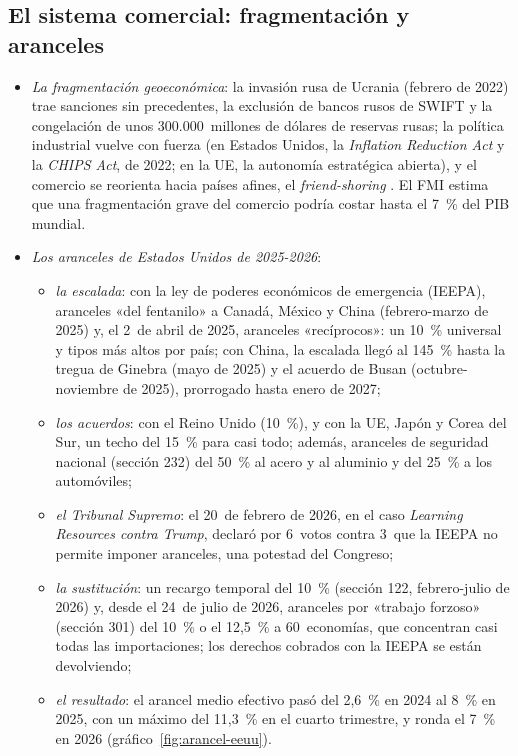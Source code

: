 \documentclass[11pt]{article}
\begin{document}
\subsection{El sistema comercial: fragmentación y aranceles}\label{sec:comercial-actual}

\begin{itemize}
\item \emph{La fragmentación geoeconómica}: la invasión rusa de Ucrania (febrero de 2022) trae sanciones sin precedentes, la exclusión de bancos rusos de SWIFT y la congelación de unos 300.000~millones de dólares de reservas rusas; la política industrial vuelve con fuerza (en Estados Unidos, la \emph{Inflation Reduction Act} y la \emph{CHIPS Act}, de 2022; en la UE, la autonomía estratégica abierta), y el comercio se reorienta hacia países afines, el \emph{friend-shoring} . El FMI estima que una fragmentación grave del comercio podría costar hasta el 7~\% del PIB mundial\nocite{Aiyar2023Fragmentacion}.
\item \emph{Los aranceles de Estados Unidos de 2025-2026}:
  \begin{itemize}
  \item \emph{la escalada}: con la ley de poderes económicos de emergencia (IEEPA), aranceles «del fentanilo» a Canadá, México y China (febrero-marzo de 2025) y, el 2~de abril de 2025, aranceles «recíprocos»: un 10~\% universal y tipos más altos por país\nocite{CasaBlanca2025Reciprocos}; con China, la escalada llegó al 145~\% hasta la tregua de Ginebra (mayo de 2025) y el acuerdo de Busan (octubre-noviembre de 2025), prorrogado hasta enero de 2027\nocite{CasaBlanca2025China,Bown2026Chart};
  \item \emph{los acuerdos}: con el Reino Unido (10~\%), y con la UE, Japón y Corea del Sur, un techo del 15~\% para casi todo\nocite{UE2025DeclaracionEEUU}; además, aranceles de seguridad nacional (sección 232) del 50~\% al acero y al aluminio y del 25~\% a los automóviles\nocite{CasaBlanca2026Metales};
  \item \emph{el Tribunal Supremo}: el 20~de febrero de 2026, en el caso \emph{Learning Resources contra Trump}, declaró por 6~votos contra 3~que la IEEPA no permite imponer aranceles, una potestad del Congreso\nocite{JonesDay2026IEEPA};
  \item \emph{la sustitución}: un recargo temporal del 10~\% (sección 122, febrero-julio de 2026) y, desde el 24~de julio de 2026, aranceles por «trabajo forzoso» (sección 301) del 10~\% o el 12,5~\% a 60~economías, que concentran casi todas las importaciones; los derechos cobrados con la IEEPA se están devolviendo\nocite{USTR2026Seccion301Trabajo};
  \item \emph{el resultado}: el arancel medio efectivo pasó del 2,6~\% en 2024 al 8~\% en 2025, con un máximo del 11,3~\% en el cuarto trimestre, y ronda el 7~\% en 2026 (gráfico~\ref{fig:arancel-eeuu})\nocite{BEA2026Aranceles,PennWharton2026Aranceles}.
  \end{itemize}
\end{itemize}
\end{document}
